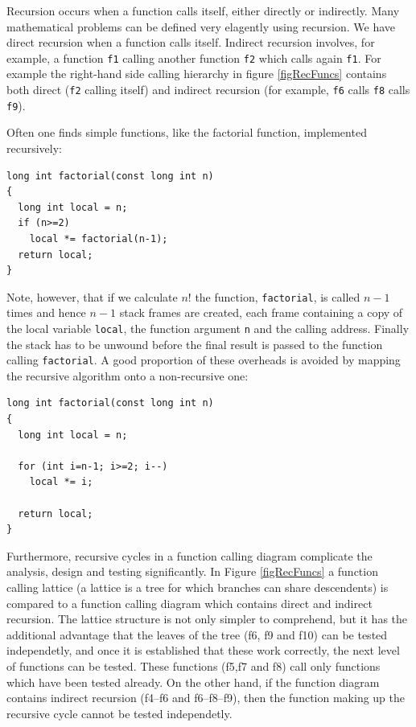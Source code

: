 Recursion occurs when a function calls itself, either directly or indirectly.
Many mathematical problems can be defined very elagently using recursion.
We have direct recursion when a function calls itself. Indirect recursion involves,
for example, a function \verb+f1+ calling another function \verb+f2+ which calls again
\verb+f1+. For example the right-hand side calling hierarchy in figure
\ref{figRecFuncs} contains both direct (\verb+f2+ calling itself) and indirect recursion
(for example, \verb+f6+ calls \verb+f8+ calls \verb+f9+).

Often one finds simple functions, like the factorial function, implemented recursively:
{\small \begin{verbatim}
long int factorial(const long int n)
{
  long int local = n;
  if (n>=2)
    local *= factorial(n-1);
  return local;
}
\end{verbatim}}
\noindent
Note, however, that if we calculate $n!$ the function, \verb+factorial+, is called $n \!\! - \!\! 1$
times and hence $n \!\! - \!\! 1$ stack frames are created, each frame containing a copy of the
local variable \verb+local+, the function argument \verb+n+ and the calling address.
Finally the stack has to be unwound before the final result is passed to the function calling
\verb+factorial+. A good proportion of these overheads is avoided by mapping the recursive
algorithm onto a non-recursive one:
{\small \begin{verbatim}
long int factorial(const long int n)
{
  long int local = n;

  for (int i=n-1; i>=2; i--)
    local *= i;

  return local;
}
\end{verbatim}}

Furthermore, recursive cycles in a function calling diagram complicate the analysis, design and testing
significantly. In Figure \ref{figRecFuncs} a function calling lattice (a lattice is a tree for which
branches can share descendents) is compared to a function calling diagram which contains
direct and indirect recursion. The lattice structure is not only simpler to comprehend, but it
has the additional advantage that the leaves of the tree (f6, f9 and f10) can be tested
independetly, and once it is established that these work correctly, the next level of functions
can be tested. These functions (f5,f7 and f8) call only functions which have been tested already.
On the other hand, if the function diagram contains indirect recursion (f4--f6 and f6--f8--f9), then
the function making up the recursive cycle cannot be tested independetly.


